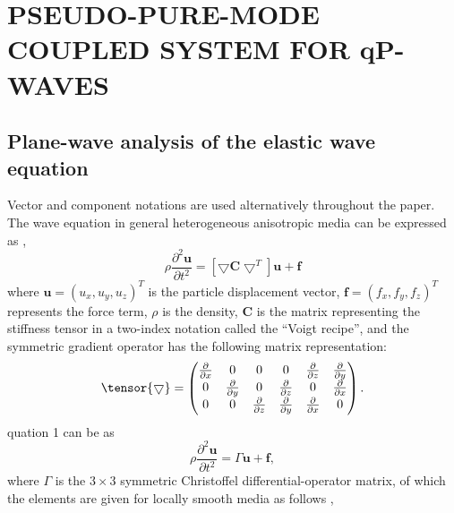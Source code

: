 \section{PSEUDO-PURE-MODE COUPLED SYSTEM FOR qP-WAVES}

\subsection{Plane-wave analysis of the elastic wave equation}
Vector and component notations are used alternatively throughout the paper. The wave equation in general
 heterogeneous anisotropic media can be expressed as \cite[]{carcione:2001},
\begin{equation}
\label{eq:elastic}
\rho\frac{\partial^2\mathbf{u}}{\partial t^2} = [{\bigtriangledown}{\mathbf{C}{\bigtriangledown}^{T}}]\mathbf{u} + \mathbf{f}
\end{equation}
where $\mathbf{u}=(u_x,u_y,u_z)^{T}$ is the particle displacement vector, $\mathbf{f}=(f_x,f_y,f_z)^{T}$ represents
 the force term, $\rho$ is the density, $\mathbf{C}$ is the matrix representing the stiffness tensor in a
 two-index notation called the “Voigt recipe”, and the symmetric gradient operator has
 the following matrix representation:
\begin{equation}
\label{eq:grad}
\tensor{\bigtriangledown} =
\begin{pmatrix}\frac{\partial}{\partial x} &0 &0 &0& \frac{\partial}{\partial z} & \frac{\partial}{\partial y} \cr
0& \frac{\partial}{\partial y} &0 & \frac{\partial}{\partial z}  &0 & \frac{\partial}{\partial x} \cr
0& 0& \frac{\partial}{\partial z} & \frac{\partial}{\partial y} & \frac{\partial}{\partial x} &0 \end{pmatrix}.
\end{equation}
quation 1 can be   as
\begin{equation}
\label{eq:elastic1}
\rho\frac{\partial^2\mathbf{u}}{\partial t^2} = \Gamma\mathbf{u} + \mathbf{f},
\end{equation}
where $\Gamma$ is the $3\times3$ symmetric Christoffel differential-operator matrix, of which the elements
 are given for locally smooth media as follows \cite[]{auld:1973},
